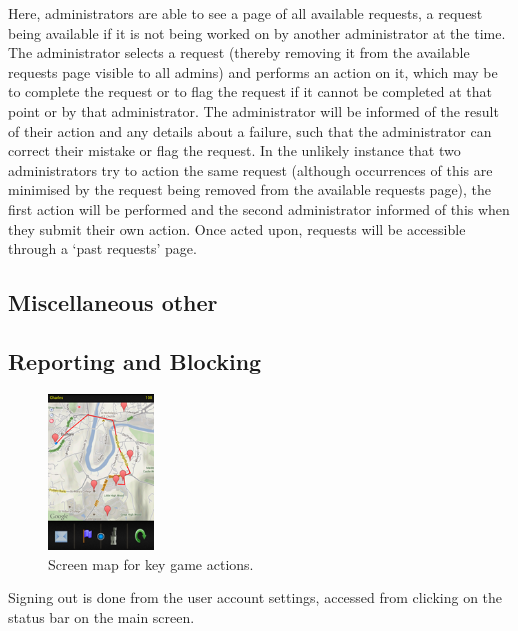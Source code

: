 Here, administrators are able to see a page of all available requests, a request being available if it is not being worked on by another administrator at the time. The administrator selects a request (thereby removing it from the available requests page visible to all admins) and performs an action on it, which may be to complete the request or to flag the request if it cannot be completed at that point or by that administrator. The administrator will be informed of the result of their action and any details about a failure, such that the administrator can correct their mistake or flag the request. In the unlikely instance that two administrators try to action the same request (although occurrences of this are minimised by the request being removed from the available requests page), the first action will be performed and the second administrator informed of this when they submit their own action. Once acted upon, requests will be accessible through a ‘past requests’ page.

\subsection{Miscellaneous other}

\subsection{Reporting and Blocking}
\begin{figure}
	\vspace{-20pt}
	\begin{center}
	\includegraphics[width=0.25\textwidth]{images/route_mapping}
	\caption{Screen map for key game actions.}
	\end{center}
	\vspace{-20pt}
\end{figure}

Signing out is done from the user account settings, accessed from clicking on the status bar on the main screen.

